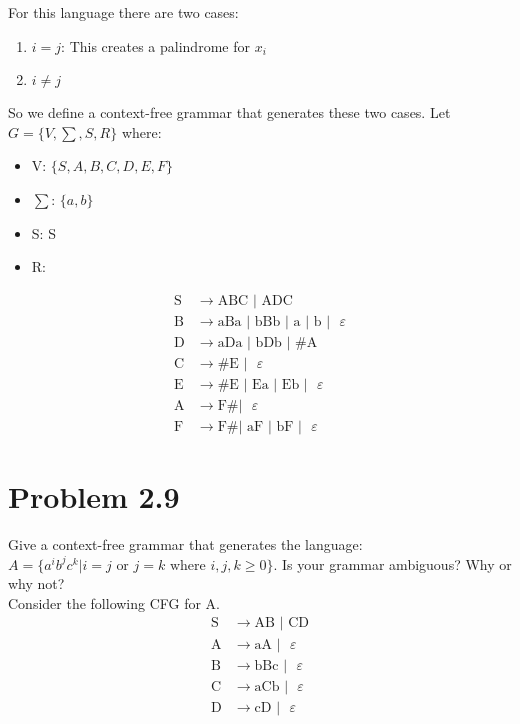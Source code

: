 \documentclass{article}
\begin{document}
For this language there are two cases:\\
  \begin{enumerate}
   \item $i=j$: This creates a palindrome for $x_i$
   \item $i \neq j$
  \end{enumerate}

So we define a context-free grammar that generates these two cases.  Let $G = \{V, \sum, S, R \}$ where:
  \begin{itemize}
   \item V: $\{S,A,B,C,D,E,F \}$
   \item $\sum$: $\{a,b \}$
   \item S: S
   \item R:
  \end{itemize}
  \begin{align*}
   \text{S} &\rightarrow \text{ABC }|\text{ ADC}\\
   \text{B} &\rightarrow \text{aBa }|\text{ bBb }|\text{ a }|\text{ b }|\text{ }\varepsilon\\
   \text{D} &\rightarrow \text{aDa }|\text{ bDb }|\text{ \#A}\\
   \text{C} &\rightarrow \text{\#E }|\text{ }\varepsilon\\
   \text{E} &\rightarrow \text{\#E }|\text{ Ea }|\text{ Eb }|\text{ }\varepsilon\\
   \text{A} &\rightarrow \text{F\# }|\text{ }\varepsilon\\
   \text{F} &\rightarrow \text{F\# }|\text{ aF }|\text{ bF }|\text{ }\varepsilon
  \end{align*}

\section*{Problem 2.9}
Give a context-free grammar that generates the language: $A = \{a^ib^jc^k|i=j \text{ or } j=k \text{ where } i,j,k \geq 0 \}$.  
Is your grammar ambiguous? Why or why not?\\

Consider the following CFG for A.\\
  \begin{align*}
   \text{S} &\rightarrow \text{AB }|\text{ CD}\\
   \text{A} &\rightarrow \text{aA }|\text{ }\varepsilon\\
   \text{B} &\rightarrow \text{bBc }|\text{ }\varepsilon\\
   \text{C} &\rightarrow \text{aCb }|\text{ }\varepsilon\\
   \text{D} &\rightarrow \text{cD }|\text{ }\varepsilon
  \end{align*}
\end{document}
